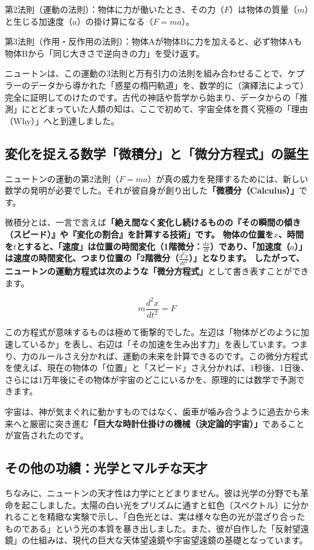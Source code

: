 第2法則（運動の法則）：物体に力が働いたとき、その力（\(F\)）は物体の質量（\(m\)）と生じる加速度（\(a\)）の掛け算になる（\(F=ma\)）。

第3法則（作用・反作用の法則）：物体Aが物体Bに力を加えると、必ず物体Aも物体Bから「同じ大きさで逆向きの力」を受け返す。

ニュートンは、この運動の3法則と万有引力の法則を組み合わせることで、ケプラーのデータから導かれた「惑星の楕円軌道」を、数学的に（演繹法によって）完全に証明してのけたのです。古代の神話や哲学から始まり、データからの「推測」にとどまっていた人類の知は、ここで初めて、宇宙全体を貫く究極の「理由（Why）」へと到達しました。

\subsection{変化を捉える数学「微積分」と「微分方程式」の誕生}

ニュートンの運動の第2法則（\(F=ma\)）が真の威力を発揮するためには、新しい数学の発明が必要でした。それが彼自身が創り出した\textbf{「微積分（Calculus）」}です。

微積分とは、一言で言えば\textbf{「絶え間なく変化し続けるものの『その瞬間の傾き（スピード）』や『変化の割合』を計算する技術」です。 物体の位置を\(x\)、時間を\(t\)とすると、「速度」は位置の時間変化（1階微分：\(\frac{dx}{dt}\)）であり、「加速度（\(a\)）」は速度の時間変化、つまり位置の「2階微分（\(\frac{d^2x}{dt^2}\)）」となります。 したがって、ニュートンの運動方程式は次のような「微分方程式」}として書き表すことができます。

\[
m\frac{d^2x}{dt^2}=F
\]

この方程式が意味するものは極めて衝撃的でした。左辺は「物体がどのように加速しているか」を表し、右辺は「その加速を生み出す力」を表しています。つまり、力のルールさえ分かれば、運動の未来を計算できるのです。この微分方程式を使えば、現在の物体の「位置」と「スピード」さえ分かれば、1秒後、1日後、さらには1万年後にその物体が宇宙のどこにいるかを、原理的には数学で予測できます。

宇宙は、神が気まぐれに動かすものではなく、歯車が噛み合うように過去から未来へと厳密に突き進む\textbf{「巨大な時計仕掛けの機械（決定論的宇宙）」}であることが宣告されたのです。

\subsection{その他の功績：光学とマルチな天才}

ちなみに、ニュートンの天才性は力学にとどまりません。彼は光学の分野でも革命を起こしました。太陽の白い光をプリズムに通すと虹色（スペクトル）に分かれることを精緻な実験で示し、「白色光とは、実は様々な色の光が混ざり合ったものである」という光の本質を暴き出しました。また、彼が自作した「反射望遠鏡」の仕組みは、現代の巨大な天体望遠鏡や宇宙望遠鏡の基礎となっています。

